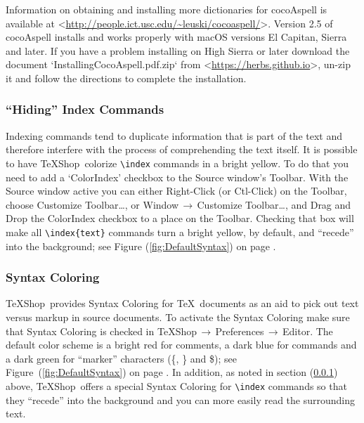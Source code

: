 \documentclass[letterpaper,11pt]{article}
\newcommand{\TS}{\textsf{\TeX Shop}}
\newcommand{\cmd}[1]{\textsf{#1}}
\newcommand{\mnu}[1]{\textsf{#1}}
\newcommand{\To}{\,\(\to\)\,}
\begin{document}
Information on obtaining and installing more dictionaries for \cmd{cocoAspell} is available at <\url{http://people.ict.usc.edu/~leuski/cocoaspell/}>. Version 2.5 of \cmd{cocoAspell} installs and works properly with \cmd{macOS} versions \cmd{El Capitan}, \cmd{Sierra} and later. If you have a problem installing on \cmd{High Sierra} or later download the document `\cmd{InstallingCocoAspell.pdf.zip}` from <\url{https://herbs.github.io}>, un-zip it and follow the directions to complete the installation.


\subsubsection{``Hiding'' Index Commands}\label{sec:Index}

Indexing commands tend to duplicate information that is part of the text and therefore interfere with the process of comprehending the text itself. It is possible to have \TS\ colorize \verb|\index| commands in a bright yellow. To do that you need to add a `\cmd{ColorIndex}' checkbox to the Source window's Toolbar. With the Source window active you can either \cmd{Right-Click} (or \cmd{Ctl-Click}) on the Toolbar, choose \mnu{Customize Toolbar\dots}, or \mnu{Window}\To\mnu{Customize Toolbar\dots}, and Drag and Drop the \cmd{ColorIndex} checkbox to a place on the Toolbar. Checking that box will make all \verb"\index{text}" commands turn a bright yellow, by default, and ``recede'' into the background; see Figure (\ref{fig:DefaultSyntax}) on page \pageref{fig:DefaultSyntax}.

\subsubsection{Syntax Coloring}

\TS\ provides Syntax Coloring for \TeX\ documents as an aid to pick out text versus markup in source documents. To activate the Syntax Coloring make sure that \mnu{Syntax Coloring} is checked in \mnu{TeXShop}\To\mnu{Preferences}\To\mnu{Editor}. The default color scheme is a bright red for comments, a dark blue for commands and a dark green for ``marker'' characters (\cmd{\{}, \cmd{\}} and \cmd{\$}); see Figure~(\ref{fig:DefaultSyntax}) on page \pageref{fig:DefaultSyntax}. In addition, as noted in section (\ref{sec:Index}) above, \TS\ offers a special Syntax Coloring for \verb"\index" commands so that they ``recede'' into the background and you can more easily read the surrounding text.
\end{document}
